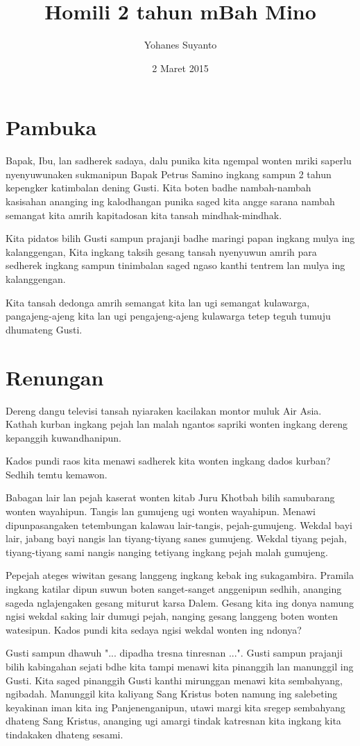 \documentclass[12pt,a4paper]{article}
\author{Yohanes Suyanto}
\title{Homili 2 tahun mBah Mino}
\date{2 Maret 2015}
\begin{document}
\maketitle
\section*{Pambuka}
Bapak, Ibu, lan sadherek sadaya, dalu punika kita ngempal wonten mriki saperlu nyenyuwunaken sukmanipun Bapak Petrus Samino ingkang sampun 2 tahun kepengker katimbalan dening Gusti. Kita boten badhe nambah-nambah kasisahan ananging ing kalodhangan punika saged kita angge sarana nambah semangat kita amrih kapitadosan kita tansah mindhak-mindhak. 

Kita pidatos bilih Gusti sampun prajanji badhe maringi papan ingkang mulya ing kalanggengan, 
Kita ingkang taksih gesang tansah nyenyuwun amrih para sedherek ingkang sampun tinimbalan saged ngaso kanthi tentrem lan mulya ing kalanggengan. 

Kita tansah dedonga amrih semangat kita lan ugi semangat kulawarga, pangajeng-ajeng kita lan ugi pengajeng-ajeng kulawarga tetep teguh tumuju dhumateng Gusti.

\section*{Renungan}
Dereng dangu televisi tansah nyiaraken kacilakan montor muluk Air Asia. Kathah kurban ingkang pejah lan malah ngantos sapriki wonten ingkang dereng kepanggih kuwandhanipun.

Kados pundi raos kita menawi sadherek kita wonten ingkang dados kurban? Sedhih temtu kemawon.


Babagan lair lan pejah kaserat wonten kitab Juru Khotbah bilih samubarang wonten wayahipun.
Tangis lan gumujeng ugi wonten wayahipun.
Menawi dipunpasangaken tetembungan kalawau
lair-tangis, pejah-gumujeng.
Wekdal bayi lair, jabang bayi nangis lan tiyang-tiyang sanes gumujeng.
Wekdal tiyang pejah, tiyang-tiyang sami nangis nanging tetiyang ingkang pejah malah gumujeng.

Pepejah ateges wiwitan gesang langgeng ingkang kebak ing sukagambira. Pramila ingkang katilar dipun suwun boten sanget-sanget anggenipun sedhih, ananging sageda nglajengaken gesang miturut karsa Dalem. Gesang kita ing donya namung ngisi wekdal saking lair dumugi pejah, nanging gesang langgeng boten wonten watesipun.
Kados pundi kita sedaya ngisi wekdal wonten ing ndonya? 

Gusti sampun dhawuh "... dipadha tresna tinresnan ...". Gusti sampun prajanji bilih kabingahan sejati bdhe kita tampi menawi kita pinanggih lan manunggil ing Gusti. Kita saged pinanggih Gusti kanthi mirunggan menawi kita sembahyang, ngibadah. Manunggil kita kaliyang Sang Kristus boten namung ing salebeting keyakinan iman kita ing Panjenenganipun, utawi margi kita sregep sembahyang dhateng Sang Kristus, ananging ugi amargi tindak katresnan kita ingkang kita tindakaken dhateng sesami. 
\end{document}

